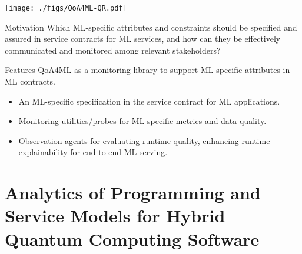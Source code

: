 \documentclass[landscape,a0,final]{a0poster} %
\begin{document}
\begin{minipage}{0.98\linewidth}
\begin{minipage}[t]{0.3\linewidth}
\begin{center}
\texttt{[image: ./figs/QoA4ML-QR.pdf]}
\end{center}
\begin{myframe}{Motivation}
    Which ML-specific attributes and constraints should be specified and assured in service contracts for ML services, and how can they be effectively communicated and monitored among relevant stakeholders?
\end{myframe}

\begin{myframe}{Features}
    QoA4ML as a monitoring library to support ML-specific attributes in ML contracts.
    \begin{itemize}
        \item An ML-specific specification in the service contract for ML applications.
        \item Monitoring utilities/probes for ML-specific metrics and data quality.
        \item Observation agents for evaluating runtime quality, enhancing runtime explainability for end-to-end ML serving.
    \end{itemize}



\end{myframe}
\section{Analytics of Programming and Service Models for Hybrid Quantum Computing Software}
\begin{center}


\end{center}
\end{minipage}
\end{minipage}
\end{document}
